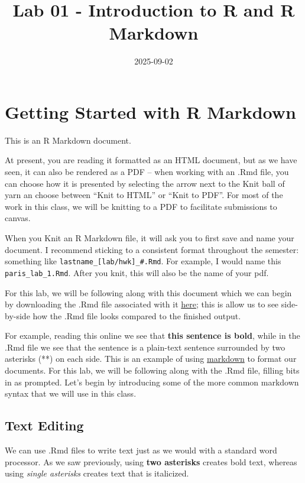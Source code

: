 \documentclass[
]{article}
\title{Lab 01 - Introduction to R and R Markdown}
\author{}
\date{\vspace{-2.5em}2025-09-02}
\begin{document}
\maketitle

{
\setcounter{tocdepth}{2}
\tableofcontents
}
\section{Getting Started with R
Markdown}\label{getting-started-with-r-markdown}

This is an R Markdown document.

At present, you are reading it formatted as an HTML document, but as we
have seen, it can also be rendered as a PDF -- when working with an .Rmd
file, you can choose how it is presented by selecting the arrow next to
the Knit ball of yarn an choose between ``Knit to HTML'' or ``Knit to
PDF''. For most of the work in this class, we will be knitting to a PDF
to facilitate submissions to canvas.

When you Knit an R Markdown file, it will ask you to first save and name
your document. I recommend sticking to a consistent format throughout
the semester: something like \texttt{lastname\_{[}lab/hwk{]}\_\#.Rmd}.
For example, I would name this \texttt{paris\_lab\_1.Rmd}. After you
knit, this will also be the name of your pdf.

For this lab, we will be following along with this document which we can
begin by downloading the .Rmd file associated with it
\href{01_introR.Rmd}{here}; this is allow us to see side-by-side how the
.Rmd file looks compared to the finished output.

For example, reading this online we see that \textbf{this sentence is
bold}, while in the .Rmd file we see that the sentence is a plain-text
sentence surrounded by two asterisks (**) on each side. This is an
example of using
\href{https://www.markdownguide.org/basic-syntax/}{markdown} to format
our documents. For this lab, we will be following along with the .Rmd
file, filling bits in as prompted. Let's begin by introducing some of
the more common markdown syntax that we will use in this class.

\subsection{Text Editing}\label{text-editing}

We can use .Rmd files to write text just as we would with a standard
word processor. As we saw previously, using \textbf{two asterisks}
creates bold text, whereas using \emph{single asterisks} creates text
that is italicized.
\end{document}
